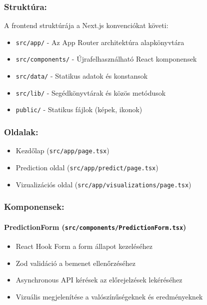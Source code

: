 \subsubsection{Struktúra:}

A frontend struktúrája a Next.js konvenciókat követi:

\begin{itemize}
    \item \texttt{src/app/} - Az App Router architektúra alapkönyvtára
    \item \texttt{src/components/} - Újrafelhasználható React komponensek
    \item \texttt{src/data/} - Statikus adatok és konstansok
    \item \texttt{src/lib/} - Segédkönyvtárak és közös metódusok
    \item \texttt{public/} - Statikus fájlok (képek, ikonok)
\end{itemize}

\subsubsection{Oldalak:}
\begin{itemize}
    \item Kezdőlap (\texttt{src/app/page.tsx})
    \item Prediction oldal (\texttt{src/app/predict/page.tsx})
    \item Vizualizációs oldal (\texttt{src/app/visualizations/page.tsx})
\end{itemize}

\subsubsection{Komponensek:}

\paragraph{PredictionForm (\texttt{src/components/PredictionForm.tsx})}
\begin{itemize}
    \item React Hook Form a form állapot kezeléséhez
    \item Zod validáció a bemenet ellenőrzéséhez
    \item Asynchronous API kérések az előrejelzések lekéréséhez
    \item Vizuális megjelenítése a valószínűségeknek és eredményeknek
\end{itemize}

